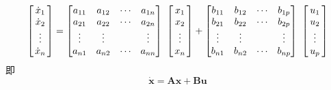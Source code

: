\begin{equation}
	\begin{bmatrix}
		\dot{x}_1\\
		\dot{x}_2\\
		\hspace*{2mm}\vdots\hspace*{2mm}\\
		\dot{x}_n
	\end{bmatrix}
	=
	\begin{bmatrix}
		a_{11} & a_{12}  & \cdots & a_{1n}\\
		a_{21} & a_{22}  & \cdots & a_{2n}\\
		\vdots & \vdots &  & \vdots\\
		a_{n1} & a_{n2}  & \cdots & a_{nn}
	\end{bmatrix}
	\,\,
	\begin{bmatrix}
		x_1\\
		x_2\\
		\hspace*{2mm}\vdots\hspace*{2mm}\\
		x_{n}
	\end{bmatrix}
	+
	\begin{bmatrix}
		b_{11} & b_{12}  & \cdots & b_{1p}\\
		b_{21} & b_{22}  & \cdots & b_{2p}\\
		\vdots & \vdots &  & \vdots\\
		b_{n1} & b_{n2}  & \cdots & b_{np}
	\end{bmatrix}
	\,\,
	\begin{bmatrix}
		{u}_1\\
		{u}_2\\
		\hspace*{2mm}\vdots\hspace*{2mm}\\
		{u}_p
	\end{bmatrix}
\end{equation}
即
\begin{equation}
	\bm{\dot{x}} = \bm{Ax} + \bm{Bu}
\end{equation}

